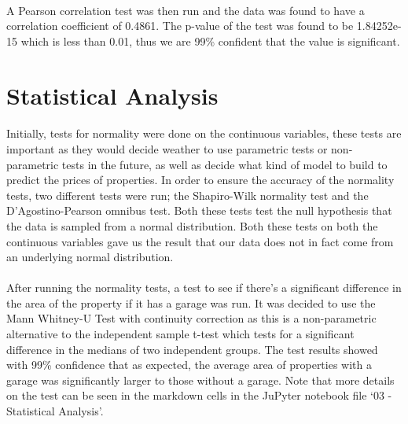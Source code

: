 \paragraph{ }A Pearson correlation test was then run and the data was found to have a correlation coefficient of 0.4861. The p-value of the test was found to be 1.84252e-15 which is less than 0.01, thus we are 99\% confident that the value is significant.

\section{Statistical Analysis}
\paragraph{ }Initially, tests for normality were done on the continuous variables, these tests are important as they would decide weather to use parametric tests or non-parametric tests in the future, as well as decide what kind of model to build to predict the prices of properties. In order to ensure the accuracy of the normality tests, two different tests were run; the Shapiro-Wilk normality test and the D'Agostino-Pearson omnibus test. Both these tests test the null hypothesis that the data is sampled from a normal distribution. Both these tests on both the continuous variables gave us the result that our data does not in fact come from an underlying normal distribution.

\paragraph{ }After running the normality tests, a test to see if there's a significant difference in the area of the property if it has a garage was run. It was decided to use the Mann Whitney-U Test with continuity correction as this is a non-parametric alternative to the independent sample t-test which tests for a significant difference in the medians of two independent groups. The test results showed with 99\% confidence that as expected, the average area of properties with a garage was significantly larger to those without a garage. Note that more details on the test can be seen in the markdown cells in the JuPyter notebook file `03 - Statistical Analysis'.